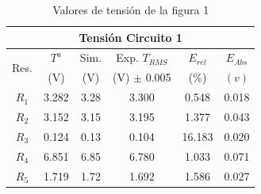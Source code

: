 \documentclass[twocolumn,11pts]{IEEEtran}
\begin{document}



\begin{table}[H]
        \caption{Valores de tensión de la figura 1 }
        \label{Tabla 1}
        \begin{center}
        \begin{tabular}{|c||c||c||c||c||c|}
        \hline
        \multicolumn{6}{|c|}{Tensión Circuito 1}\\ \hline
        \multirow{ 2}{*}{Res.}& $T^a$	&Sim. & Exp. \tiny{$T_{RMS}$} & $E_{rel}$&$E_{Abs}$\\
         &  \tiny{(V)} &  \tiny{(V)} & \tiny{(V) $\pm$ 0.005} & \tiny{(\%)} & \tiny{$(v)$} \\ \hline
        \tiny{$R_1$} &3.282 & 3.28 &3.300 &0.548 & 0.018 \\  \hline
        \tiny{$R_2$} &3.152 & 3.15 &3.195 &1.377 & 0.043 \\  \hline
        \tiny{$R_3$} &0.124& 0.13 &0.104  &16.183 & 0.020 \\  \hline
        \tiny{$R_4$} &6.851 & 6.85 &6.780  &1.033 & 0.071 \\  \hline
        \tiny{$R_5$} &1.719 &1.72 &1.692  &1.586 &0.027 \\  \hline
        \end{tabular}
        \end{center}
    \end{table}
    \vspace{0.2 cm}
\end{document}
